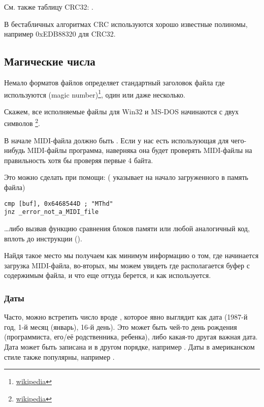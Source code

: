 См. также таблицу CRC32: .

В бестабличных алгоритмах CRC используются хорошо известные полиномы, например 0xEDB88320 для CRC32.

\subsection{Магические числа}
\label{magic_numbers}

\newcommand{\FNURLMAGIC}{\footnote{\href{http://go.yurichev.com/17112}{wikipedia}}}

Немало форматов файлов определяет стандартный заголовок файла где используются  (magic number)\FNURLMAGIC{}, один или даже несколько.

Скажем, все исполняемые файлы для Win32 и MS-DOS начинаются с двух символов \footnote{\href{http://go.yurichev.com/17113}{wikipedia}}.

В начале MIDI-файла должно быть . Если у нас есть использующая для чего-нибудь MIDI-файлы программа,
наверняка она будет проверять MIDI-файлы на правильность хотя бы проверяя первые 4 байта.

Это можно сделать при помощи:
( указывает на начало загруженного в память файла)

\begin{lstlisting}[style=customasm]
cmp [buf], 0x6468544D ; "MThd"
jnz _error_not_a_MIDI_file
\end{lstlisting}

\dots либо вызвав функцию сравнения блоков памяти  или любой аналогичный код, 
вплоть до инструкции  ().

Найдя такое место мы получаем как минимум информацию о том, где начинается загрузка MIDI-файла, во-вторых, 
мы можем увидеть где располагается буфер с содержимым файла, и что еще оттуда берется, и как используется.

\subsubsection{Даты}


Часто, можно встретить число вроде , которое явно выглядит как дата (1987-й год, 1-й месяц (январь), 16-й день).
Это может быть чей-то день рождения (программиста, его/её родственника, ребенка), либо какая-то другая важная дата.
Дата может быть записана и в другом порядке, например .
Даты в американском стиле также популярны, например .

